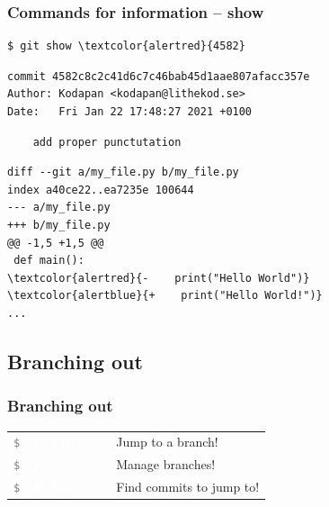 \documentclass{beamer}
\newcommand{\command}[1]{\colorbox{black!78}{\vphantom{Ep}\texttt{\textcolor{gray}{\$}
\textcolor{white}{#1}}}}
\begin{document}
\begin{frame}[fragile]
  \frametitle{Commands for information -- show}
\begin{Verbatim}[commandchars=\\\{\}]
$ git show \textcolor{alertred}{4582}
\end{Verbatim}
\pause{}
\vspace{-2.5ex}
\begin{verbatim}
commit 4582c8c2c41d6c7c46bab45d1aae807afacc357e
Author: Kodapan <kodapan@lithekod.se>
Date:   Fri Jan 22 17:48:27 2021 +0100
\end{verbatim}
\vspace{-3ex}
\begin{verbatim}
    add proper punctutation
\end{verbatim}
\vspace{-2ex}
\begin{Verbatim}[commandchars=\\\{\}]
diff --git a/my_file.py b/my_file.py
index a40ce22..ea7235e 100644
--- a/my_file.py
+++ b/my_file.py
@@ -1,5 +1,5 @@
 def main():
\textcolor{alertred}{-    print("Hello World")}
\textcolor{alertblue}{+    print("Hello World!")}
...
\end{Verbatim}
\end{frame}

\subsection{Branching out}

\begin{frame}[fragile]
  \frametitle{Branching out}

  \begin{tabular}{ll}
    \command{git checkout} & Jump to a branch! \\
    \command{git branch} & Manage branches! \\
    \command{git log} & Find commits to jump to! \\
  \end{tabular}

\end{frame}
\end{document}
